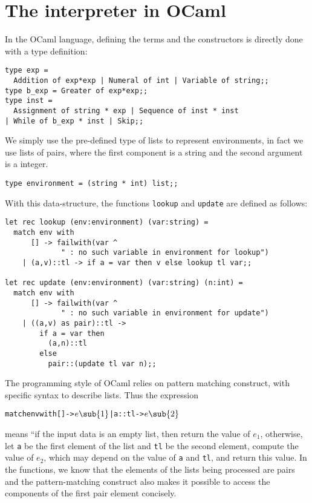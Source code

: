\documentclass{book}
\begin{document}
\section{The interpreter in OCaml}
In the OCaml language, defining the terms and the constructors is
directly done with a type definition:
\begin{verbatim}
type exp = 
  Addition of exp*exp | Numeral of int | Variable of string;;
type b_exp = Greater of exp*exp;;
type inst = 
  Assignment of string * exp | Sequence of inst * inst
| While of b_exp * inst | Skip;;
\end{verbatim}
We simply use the pre-defined type of lists to represent environments,
in fact we use lists of pairs, where the first component is a string
and the second argument is a integer.
\begin{verbatim}
type environment = (string * int) list;;
\end{verbatim}
With this data-structure, the functions {\tt lookup} and {\tt update}
are defined as follows:
\begin{verbatim}
let rec lookup (env:environment) (var:string) =
  match env with
      [] -> failwith(var ^ 
             " : no such variable in environment for lookup")
    | (a,v)::tl -> if a = var then v else lookup tl var;;

let rec update (env:environment) (var:string) (n:int) =
  match env with
      [] -> failwith(var ^
             " : no such variable in environment for update")
    | ((a,v) as pair)::tl ->
        if a = var then 
          (a,n)::tl 
        else
          pair::(update tl var n);;
\end{verbatim}
The programming style of OCaml relies on pattern matching construct,
with specific syntax to describe lists.  Thus the expression
\begin{alltt}
  match env with [] -> \(e\sub{1}\) | a::tl -> \(e\sub{2}\)
\end{alltt}
means ``if the input data is an empty list, then return the
value of \(e_1\), otherwise, let {\tt a} be the first element of
the list and {\tt tl} be the second element, compute the value
of \(e_2\), which may depend on the value of {\tt a} and {\tt tl},
and return this value.  In the functions, we know that the elements
of the lists being processed are pairs and the pattern-matching
construct also makes it possible to access the components of
the first pair element concisely.
\end{document}
